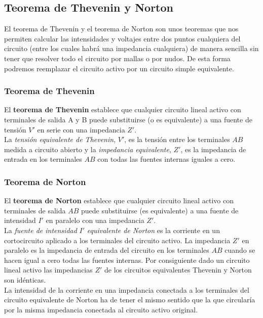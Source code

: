 \documentclass[12pt]{article}
\begin{document}
\subsection{Teorema de Thevenin y Norton}

El teorema de Thevenin y el teorema de Norton son unos teoremas que nos permiten calcular las intensidades y voltajes entre dos puntos cualquiera del circuito (entre los cuales habrá una impedancia cualquiera) de manera sencilla sin tener que resolver todo el circuito por mallas o por nudos. De esta forma podremos reemplazar el circuito activo por un circuito simple equivalente. 

\subsubsection{Teorema de Thevenin}

El \textbf{teorema de Thevenin} establece que cualquier circuito lineal activo con terminales de salida A y B puede substituirse (o es equivalente) a una fuente de tensión $V'$ en serie con una impedancia $Z'$. \\

La \textit{tensión equivalente de Thevenin}, $V'$, es la tensión entre los terminales $AB$ medida a circuito abierto y la \textit{impedancia equivalente}, $Z'$, es la impedancia de entrada en los terminales $AB$ con todas las fuentes internas iguales a cero.

\subsubsection{Teorema de Norton}

El \textbf{teorema de Norton} establece que cualquier circuito lineal activo con terminales de salida $AB$ puede substituirse (es equivalente) a una fuente de intensidad $I'$ en paralelo con una impedancia $Z'$. \\

La \textit{fuente de intensidad} $I'$ \textit{equivalente de Norton} es la corriente en un cortocircuito aplicado a los terminales del circuito activo. La impedancia $Z'$ en paralelo es la impedancia de entrada del circuito en los terminales $AB$ cuando se hacen igual a cero todas las fuentes internas. Por consiguiente dado un circuito lineal activo las impedancias $Z'$ de los circuitos equivalentes Thevenin y Norton son idénticas. \\

La intensidad de la corriente en una impedancia conectada a los terminales del circuito equivalente de Norton ha de tener el mismo sentido que la que circularía por la misma impedancia conectada al circuito activo original.
\end{document}
